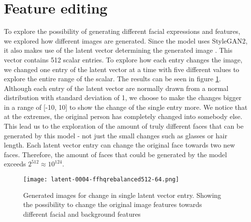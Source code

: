 \section{Feature editing}

To explore the possibility of generating different facial expressions and features, we explored how different images are generated. Since the model uses StyleGAN2, it also makes use of the latent vector determining the generated image \cite{StyleGAN2}. This vector contains 512 scalar entries. To explore how each entry changes the image, we changed one entry of the latent vector at a time with five different values to explore the entire range of the scalar. The results can be seen in figure \ref{fig:changing_latent}. Although each entry of the latent vector are normally drawn from a normal distribution with standard deviation of 1, we choose to make the changes bigger in a range of [-10, 10] to show the change of the single entry more. We notice that at the extremes, the original person has completely changed into somebody else. This lead us to the exploration of the amount of truly different faces that can be generated by this model - not just the small changes such as glasses or hair length. Each latent vector entry can change the original face towards two new faces. Therefore, the amount of faces that could be generated by the model exceeds $2^{512} \approx 10^{124}$.

\begin{figure}[H]
    \centering
    \texttt{[image: latent-0004-ffhqrebalanced512-64.png]}
    \caption[width=0.6]{Generated images for change in single latent vector entry. Showing the possibility to change the original image features towards different facial and background features}
    \label{fig:changing_latent}
\end{figure}